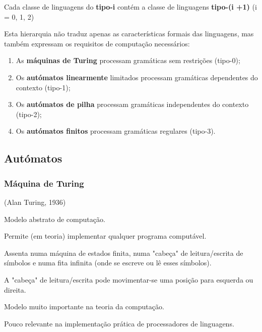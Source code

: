 \documentclass{article}
\begin{document}
\begin{flushleft}
  \item Cada classe de linguagens do \textbf{tipo-i} contém a classe de
  linguagens \textbf{tipo-(i +1)} (i = 0, 1, 2)
  \item Esta hierarquia não traduz apenas as características
  formais das linguagens, mas também expressam os
  requisitos de computação necessários:
  \begin{enumerate}
    \item As \textbf{máquinas de Turing} processam gramáticas sem
    restrições (tipo-0);
    \item Os \textbf{autómatos linearmente} limitados processam gramáticas
    dependentes do contexto (tipo-1);
    \item Os \textbf{autómatos de pilha} processam gramáticas
    independentes do contexto (tipo-2);
    \item Os \textbf{autómatos finitos} processam gramáticas regulares
    (tipo-3).
  \end{enumerate}
\end{flushleft}

\subsection{Autómatos}

\subsubsection{Máquina de Turing}

\begin{flushleft}
  \item (Alan Turing, 1936)
  \item Modelo abstrato de computação.
  \item Permite (em teoria) implementar qualquer programa
  computável.
  \item Assenta numa máquina de estados finita, numa "cabeça"
  de leitura/escrita de símbolos e numa fita infinita (onde se
  escreve ou lê esses símbolos).
  \item A "cabeça" de leitura/escrita pode movimentar-se uma
  posição para esquerda ou direita.
  \item Modelo muito importante na teoria da computação.
  \item Pouco relevante na implementação prática de
  processadores de linguagens.
\end{flushleft}
\end{document}

